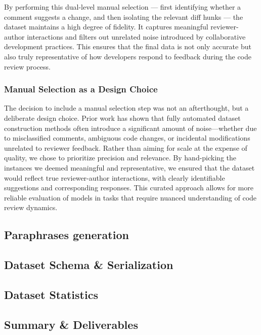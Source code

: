 By performing this dual-level manual selection — first identifying whether a comment suggests a
change, and then isolating the relevant diff hunks — the dataset maintains a high degree of
fidelity. It captures meaningful reviewer-author interactions and filters out unrelated noise
introduced by collaborative development practices. This ensures that the final data is not only
accurate but also truly representative of how developers respond to feedback during the code review
process.

\subsubsection{Manual Selection as a Design Choice}

The decision to include a manual selection step was not an afterthought, but a deliberate design
choice. Prior work has shown that fully automated dataset construction methods often introduce a
significant amount of noise—whether due to misclassified comments, ambiguous code changes, or
incidental modifications unrelated to reviewer feedback. Rather than aiming for scale at the expense
of quality, we chose to prioritize precision and relevance. By hand-picking the instances we deemed
meaningful and representative, we ensured that the dataset would reflect true reviewer-author
interactions, with clearly identifiable suggestions and corresponding responses. This curated
approach allows for more reliable evaluation of models in tasks that require nuanced understanding
of code review dynamics.

\subsection{Paraphrases generation}
\subsection{Dataset Schema \& Serialization}
\subsection{Dataset Statistics}
\subsection{Summary \& Deliverables}
